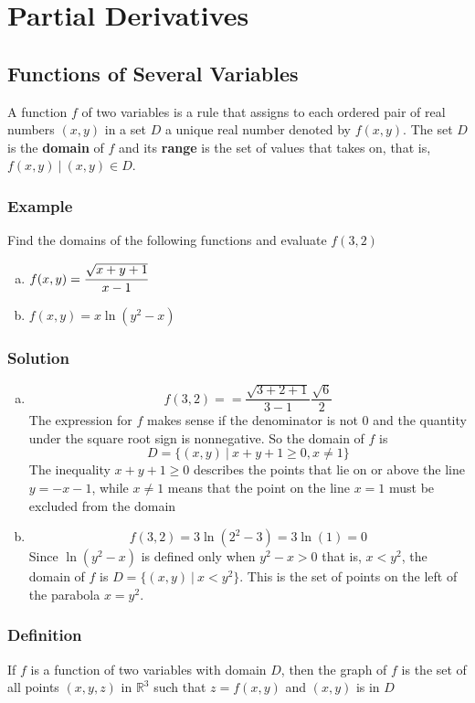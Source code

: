 \chapter{Partial Derivatives}

\section{Functions of Several Variables}
A function $f$ of two variables is a rule that assigns to each ordered pair of
real numbers $(x,y)$ in a set $D$ a unique real number denoted by
$f(x,y)$. The set $D$ is the \textbf{domain} of $f$ and its \textbf{range} is
the set of values that takes on, that is, ${f(x,y)\:|\:(x,y)\in D}$.

\subsection*{Example}
Find the domains of the following functions and evaluate $f(3,2)$
\begin{enumerate}[(a)]
    \item $f(x,y)=\cfrac{\sqrt{x+y+1}}{x-1}$
    \item $f(x,y)=x\ln(y^2-x)$
\end{enumerate}

\subsection*{Solution}
\begin{enumerate}[(a)]
    \item $$f(3,2)==\frac{\sqrt{3+2+1}}{3-1}\frac{\sqrt{6}}{2}$$
          The expression for $f$ makes sense if the denominator is not 0 and the
          quantity under the square root sign is nonnegative. So the domain of $f$ is
          $$D=\{(x,y)\:|\:x+y+1\geq 0, x\neq 1\}$$
          The inequality $x+y+1\geq 0$ describes the points that lie on or above the line
          $y=-x-1$, while $x\neq 1$ means that the point on the line $x=1$ must be excluded
          from the domain
    \item $$f(3,2)=3\ln(2^2-3)=3\ln(1)=0$$
          Since $\ln(y^2-x)$ is defined only when $y^2-x>0$ that is, $x<y^2$, the
          domain of $f$ is $D=\{(x,y)\:|\:x<y^2\}$. This is the set of points on the left
          of the parabola $x=y^2$.
\end{enumerate}

\subsection*{Definition}
If $f$ is a function of two variables with domain $D$, then the graph of $f$ is the
set of all points $(x,y,z)$ in $\mathbb{R}^3$ such that $z=f(x,y)$ and $(x,y)$ is in $D$

